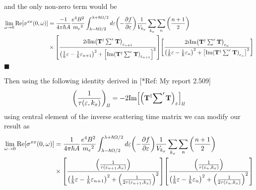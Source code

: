 and the only non-zero term would be
\begin{equation} \label{7.8}
  \begin{aligned}
    \lim_{\omega \to 0}
    \text{Re}[{\sigma}^{xx}(0,\omega)] & =
    \frac{-1}{4\pi\hbar A}
    \frac{e^4B^2}{{{m_e}^2}}
    \int_{\lambda-\hbar\Omega/2}^{\lambda+ \hbar\Omega/2} d\varepsilon
    \qty(
    -\frac{\partial f}{\partial \varepsilon})
    \frac{1}{V_{k_x}} \sum_{k_x} \sum_{n}
    \qty(\frac{n+1}{2})
    \\
    & \times
    \qty[
    \frac{2i \text{Im}\qty(\mathbf{T}^{\dagger} \sum^r \mathbf{T})_{\varepsilon_{n+1}}
    }
    {
    \qty(
    \frac{1}{\hbar}\varepsilon -
    \frac{1}{\hbar}\varepsilon_{n+1}
    )^2
    + \qty[\text{Im}\qty(\mathbf{T}^{\dagger} \sum^r \mathbf{T})_{\varepsilon_{n+1}}]^2
    }]
    \qty[
    \frac{2i \text{Im}\qty(\mathbf{T}^{\dagger} \sum^r \mathbf{T})_{\varepsilon_{n}}
    }
    {
    \qty(
    \frac{1}{\hbar}\varepsilon -
    \frac{1}{\hbar}\varepsilon_{n}
    )^2
    + \qty[\text{Im}\qty(\mathbf{T}^{\dagger} \sum^r \mathbf{T})_{\varepsilon_{n}}]^2
    }]
  \end{aligned}
\end{equation}
\hfill$\blacksquare$

\noindent
Then using the following identity derived in [*Ref: My report 2.509]
\begin{equation} \label{7.9}
  \qty(\frac{1}{\tau(\varepsilon,k_x)})_{ll} =
  -2\text{Im}\qty[\qty(\mathbf{T}^{\dagger} {\sum}^r \mathbf{T})_{\varepsilon}]_{ll}
\end{equation}
using central element of the inverse scattering time matrix we can modify our result as
\begin{equation} \label{7.10}
  \begin{aligned}
    \lim_{\omega \to 0}
    \text{Re}[{\sigma}^{xx}(0,\omega)] & =
    \frac{1}{4\pi\hbar A}
    \frac{e^4B^2}{{{m_e}^2}}
    \int_{\lambda-\hbar\Omega/2}^{\lambda+ \hbar\Omega/2} d\varepsilon
    \qty(
    -\frac{\partial f}{\partial \varepsilon})
    \frac{1}{V_{k_x}} \sum_{k_x} \sum_{n}
    \qty(\frac{n+1}{2})
    \\
    & \times
    \qty[
    \frac{\qty(\frac{1}{\tau(\varepsilon_{n+1},k_x)})
    }
    {
    \qty(
    \frac{1}{\hbar}\varepsilon -
    \frac{1}{\hbar}\varepsilon_{n+1}
    )^2
    + \qty(\frac{1}{2\tau(\varepsilon_{n+1},k_x)})^2
    }]
    \qty[
    \frac{\qty(\frac{1}{\tau(\varepsilon_{n},k_x)})
    }
    {
    \qty(
    \frac{1}{\hbar}\varepsilon -
    \frac{1}{\hbar}\varepsilon_{n}
    )^2
    + \qty(\frac{1}{2\tau(\varepsilon_{n},k_x)})^2
    }]
  \end{aligned}
\end{equation}

